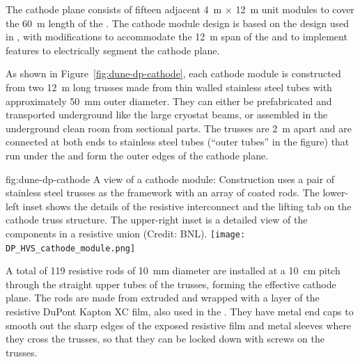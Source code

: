 The cathode plane consists of fifteen adjacent \SI{4}{\m} $\times$ \SI{12}{\m} unit modules to cover the \SI{60}{\m} length of the  . 
The cathode module design is based on the design used in , with modifications to %
accommodate the \SI{12}{\m} span of the  and to implement features to electrically segment the cathode plane.

As shown in  Figure~\ref{fig:dune-dp-cathode}, each cathode module is constructed from two \SI{12}{\m} long trusses made from thin walled stainless steel tubes with approximately \SI{50}{\mm} outer diameter.  They can either be prefabricated and transported underground like the large cryostat beams, or assembled in the underground clean room from sectional parts. 
The trusses are \SI{2}{\m} apart and are %
connected at both ends %
to stainless steel tubes (``outer tubes'' in the figure) that %
run under the  and form the outer edges of the cathode plane.

\begin{dunefigure}{fig:dune-dp-cathode}
{A view of a  cathode module:  Construction uses a pair of stainless steel trusses as the framework with an array of coated  rods. %
The lower-left inset shows the details of the resistive interconnect and the lifting tab on the cathode truss structure. The upper-right inset is a detailed view of the components in a resistive union (Credit: BNL).}
\texttt{[image: DP\_HVS\_cathode\_module.png]}
\end{dunefigure}

A total of \num{119} resistive rods of \SI{10}{\mm} diameter are installed at a  \SI{10}{\cm} pitch through  the %
straight upper tubes of the trusses, forming the effective cathode plane. The rods are made from extruded  and wrapped with a layer of the resistive DuPont Kapton XC film, also used in the  . %
They have metal end caps to smooth out the sharp edges of the exposed resistive film and metal sleeves where they cross the trusses, so that they can be locked down with screws on %
the trusses. 

